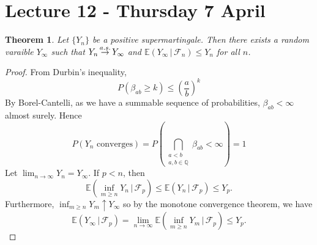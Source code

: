 \documentclass[10pt, oneside, reqno]{amsart}
\theoremstyle{plain}%
\newtheorem{thm}{Theorem}[section]
\theoremstyle{definition}
\theoremstyle{remark}
\newcommand{\given}{ \, | \,}
\newcommand{\sigf}{\mathcal{F}}
\newcommand{\Q}{\mathbb{Q}}
\newcommand{\E}{\mathbb{E}}
\def\cas{\,{\buildrel a.s. \over \rightarrow}\,}
\begin{document}

\section{Lecture 12 - Thursday 7 April} %
\label{sec:lecture_12_thursday_7_april}
\begin{thm}
    Let $\{ Y_n \}$ be a positive supermartingale.  Then there exists a random varaible $Y_\infty$ such that $Y_n \cas Y_\infty$ and $\E(Y_\infty \given \sigf_n) \leq Y_n$ for all $n$.
\end{thm}
\begin{proof}
    From Durbin's inequality, \[
        P(\beta_{ab} \geq k) \leq \left( \frac{a}{b} \right)^k
    \]  By Borel-Cantelli, as we have a summable sequence of probabilities, $\beta_{ab}  < \infty$ almost surely.  Hence \[
        P(\text{$Y_n$ converges}) = P\left(\bigcap_{\substack{a < b \\ a, b \in \Q}} \beta_{ab} < \infty \right) = 1
    \] Let $\lim_{n \rightarrow \infty}Y_n = Y_\infty$. If $p < n$, then \[
        \E\left( \inf_{m \geq n} Y_n \given \sigf_p \right) \leq \E(Y_n \given \sigf_p) \leq Y_p.   \]  Furthermore, $\inf_{m \geq n} Y_m \uparrow Y_\infty$ so by the monotone convergence theorem, we have \[
            \E(Y_\infty \given \sigf_p) = \lim_{n \rightarrow \infty} \E\left( \inf_{m \geq n} Y_m \given \sigf_p \right) \leq Y_p.
        \]  
\end{proof}
\end{document}
